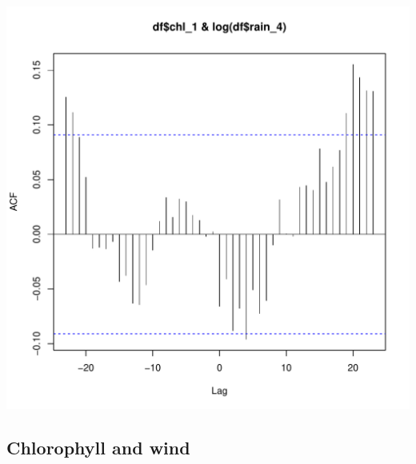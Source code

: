 \documentclass{article}\usepackage[]{graphicx}\usepackage[]{color}
\makeatletter
\def\maxwidth{ %
  \ifdim\Gin@nat@width>\linewidth
    \linewidth
  \else
    \Gin@nat@width
  \fi
}
\newenvironment{knitrout}{}{} %
\makeatother
\begin{document}
\begin{knitrout}
\includegraphics[width=\maxwidth]{figure/unnamed-chunk-26-2} 

\end{knitrout}

\subsection{Chlorophyll and wind}
\end{document}
